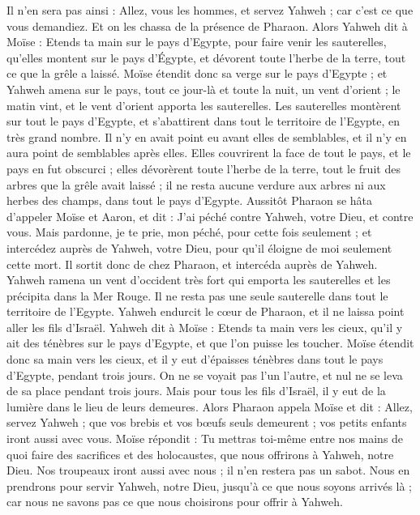 \begin{multicols}{2}
Il n'en sera pas ainsi : Allez, vous les hommes, et servez Yahweh ; car c'est ce que vous demandiez. Et on les chassa de la présence de Pharaon.
Alors Yahweh dit à Moïse : Etends ta main sur le pays d'Egypte, pour faire venir les sauterelles, qu'elles montent sur le pays d'Égypte, et dévorent toute l'herbe de la terre, tout ce que la grêle a laissé.
Moïse étendit donc sa verge sur le pays d'Egypte ; et Yahweh amena sur le pays, tout ce jour-là et toute la nuit, un vent d'orient ; le matin vint, et le vent d'orient apporta les sauterelles.
Les sauterelles montèrent sur tout le pays d'Egypte, et s'abattirent dans tout le territoire de l'Egypte, en très grand nombre. Il n'y en avait point eu avant elles de semblables, et il n'y en aura point de semblables après elles.
Elles couvrirent la face de tout le pays, et le pays en fut obscurci ; elles dévorèrent toute l'herbe de la terre, tout le fruit des arbres que la grêle avait laissé ; il ne resta aucune verdure aux arbres ni aux herbes des champs, dans tout le pays d'Egypte.
Aussitôt Pharaon se hâta d'appeler Moïse et Aaron, et dit : J'ai péché contre Yahweh, votre Dieu, et contre vous.
Mais pardonne, je te prie, mon péché, pour cette fois seulement ; et intercédez auprès de Yahweh, votre Dieu, pour qu'il éloigne de moi seulement cette mort.
Il sortit donc de chez Pharaon, et intercéda auprès de Yahweh.
Yahweh ramena un vent d'occident très fort qui emporta les sauterelles et les précipita dans la Mer Rouge. Il ne resta pas une seule sauterelle dans tout le territoire de l'Egypte.
Yahweh endurcit le cœur de Pharaon, et il ne laissa point aller les fils d'Israël.
Yahweh dit à Moïse : Etends ta main vers les cieux, qu'il y ait des ténèbres sur le pays d'Egypte, et que l’on puisse les toucher.
Moïse étendit donc sa main vers les cieux, et il y eut d'épaisses ténèbres dans tout le pays d'Egypte, pendant trois jours.
On ne se voyait pas l'un l'autre, et nul ne se leva de sa place pendant trois jours. Mais pour tous les fils d'Israël, il y eut de la lumière dans le lieu de leurs demeures.
Alors Pharaon appela Moïse et dit : Allez, servez Yahweh ; que vos brebis et vos bœufs seuls demeurent ; vos petits enfants iront aussi avec vous.
Moïse répondit : Tu mettras toi-même entre nos mains de quoi faire des sacrifices et des holocaustes, que nous offrirons à Yahweh, notre Dieu.
Nos troupeaux iront aussi avec nous ; il n'en restera pas un sabot. Nous en prendrons pour servir Yahweh, notre Dieu, jusqu’à ce que nous soyons arrivés là ; car nous ne savons pas ce que nous choisirons pour offrir à Yahweh.

\end{multicols}
